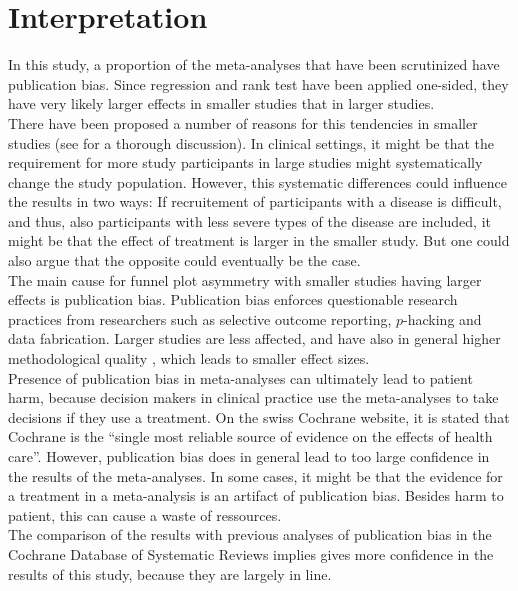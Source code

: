 \documentclass[11pt,a4paper,twoside]{book}\usepackage[]{graphicx}\usepackage[]{color}
\begin{document}
\section{Interpretation}
In this study, a proportion of the meta-analyses that have been scrutinized have publication bias. Since regression and rank test have been applied one-sided, they have very likely larger effects in smaller studies that in larger studies. \\
There have been proposed a number of reasons for this tendencies in smaller studies (see \citet{Egger} for a thorough discussion). In clinical settings, it might be that the requirement for more study participants in large studies might systematically change the study population. However, this systematic differences could influence the results in two ways: If recruitement of participants with a disease is difficult, and thus, also participants with less severe types of the disease are included, it might be that the effect of treatment is larger in the smaller study. But one could also argue that the opposite could eventually be the case. \\
The main cause for funnel plot asymmetry with smaller studies having larger effects is publication bias. Publication bias enforces questionable research practices from researchers such as selective outcome reporting, $p$-hacking and data fabrication. Larger studies are less affected, and have also in general higher methodological quality \citep{Egger}, which leads to smaller effect sizes.\\
Presence of publication bias in meta-analyses can ultimately lead to patient harm, because decision makers in clinical practice use the meta-analyses to take decisions if they use a treatment. On the swiss Cochrane website, it is stated that Cochrane is the ``single most reliable source of evidence on the effects of health care''. However, publication bias does in general lead to too large confidence in the results of the meta-analyses. In some cases, it might be that the  evidence for a treatment in a meta-analysis is an artifact of publication bias. Besides harm to patient, this can cause a waste of ressources. \\
The comparison of the results with previous analyses of publication bias in the Cochrane Database of Systematic Reviews implies gives more confidence in the results of this study, because they are largely in line. \\
\end{document}
